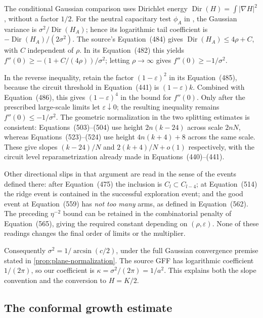 The conditional Gaussian comparison uses Dirichlet energy
$\operatorname{Dir}(H)=\int|\nabla H|^2$, without a factor $1/2$.
For the neutral capacitary test $\phi_A$ in
\cite[Section~25]{DKLM2026}, the Gaussian variance is
$\sigma^2/\operatorname{Dir}(H_A)$; hence its logarithmic tail
coefficient is $-\operatorname{Dir}(H_A)/(2\sigma^2)$.
The source's Equation~(484) gives
$\operatorname{Dir}(H_A)\le4\rho+C$, with \(C\) independent of \(\rho\).
In its Equation~(482) this yields
$f''(0)\ge-(1+C/(4\rho))/\sigma^2$; letting \(\rho\to\infty\) gives
$f''(0)\ge-1/\sigma^2$.

In the reverse inequality, retain the factor $(1-\varepsilon)^2$
in its Equation~(485), because the circuit threshold in
Equation~(441) is $(1-\varepsilon)k$. Combined with Equation~(486),
this gives $(1-\varepsilon)^4$ in the bound for $f''(0)$.
Only after the prescribed large-scale limits let
$\varepsilon\downarrow0$; the resulting inequality remains
$f''(0)\le-1/\sigma^2$. The geometric normalization in the two
splitting estimates is consistent: Equations~(503)--(504) use
height $2n(k-24)$ across scale $2nN$, whereas
Equations~(523)--(524) use height $4n(k+4)+8$ across the same scale.
These give slopes $(k-24)/N$ and $2(k+4)/N+o(1)$ respectively,
with the circuit level reparametrization already made in
Equations~(440)--(441).

Other directional slips in that argument are read in the sense of the
events defined there: after Equation~(475) the inclusion is
$C_l\subset C_{l-4}$; at Equation~(514) the ridge event is contained
in the successful exploration event; and the good event at
Equation~(559) has \emph{not too many} arms, as defined in
Equation~(562). The preceding $\eta^{-2}$ bound can be retained
in the combinatorial penalty of Equation~(565), giving the required
constant depending on $(\rho,\varepsilon)$. None of these readings
changes the final order of limits or the multiplier.

Consequently $\sigma^2=1/\arcsin(c/2)$, under the full Gaussian
convergence premise stated in \cref{prop:plane-normalization}.
The source GFF has logarithmic coefficient $1/(2\pi)$, so our
coefficient is $\kappa=\sigma^2/(2\pi)=1/a^2$. This explains both
the slope convention and the conversion to $H=K/2$.

\subsection{The conformal growth estimate}
\label{sec:conformal-growth}

